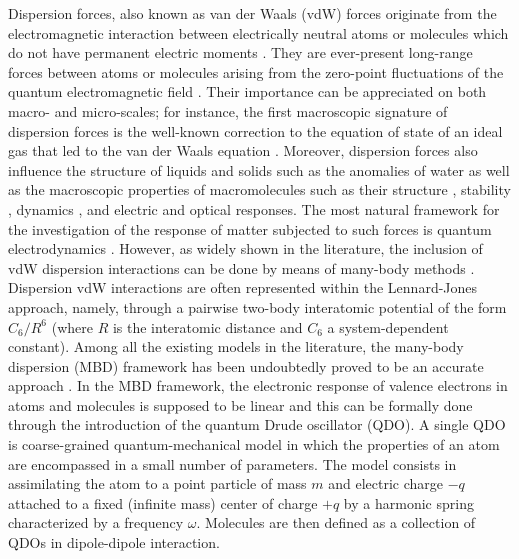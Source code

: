 \documentclass[reprint, amsmath, amssymb, aps]{revtex4-2}
\begin{document}
    Dispersion forces, also known as van der Waals (vdW) forces originate from the electromagnetic interaction between electrically neutral atoms or molecules which do not have permanent electric moments \cite{margenau2013theory,kaplan2006intermolecular,stone2013theory,hirschfelder2009intermolecular}. They are ever-present long-range forces between atoms or molecules arising from the zero-point fluctuations of the quantum electromagnetic field \cite{casimir1948influence,buhmann2013dispersion,buhmann2007dispersion,compagno1995atom,passante2018dispersion}. Their importance can be appreciated on both macro- and micro-scales; for instance, the first macroscopic signature of dispersion forces is the well-known correction to the equation of state of an ideal gas that led to the van der Waals equation \cite{milonni2013quantum}. Moreover, dispersion forces also influence the structure of liquids and solids such as the anomalies of water \cite{schmid2001recent} as well as the macroscopic properties of macromolecules such as their structure \cite{hoja2019reliable}, stability \cite{hoja2018first,mortazavi2018structure}, dynamics \cite{stohr2019quantum,reilly2014role,galante2021anisotropic}, and electric \cite{kleshchonok2018tailoring} and optical \cite{ambrosetti2022optical} responses. The most natural framework for the investigation of the response of matter subjected to such forces is quantum electrodynamics \cite{cohen1997photons,cohen1998atom,bookpreparata,salam2009molecular,craig1998t}. However, as widely shown in the literature, the inclusion of vdW dispersion interactions can be done by means of many-body methods \cite{richardson1975dispersion,mahanty1973dispersion,woods2016materials,tkatchenko2015current,ren2012random,harl2009accurate,dobson2012calculation,parsegian2005van}. Dispersion vdW interactions are often represented within the Lennard-Jones approach, namely, through a pairwise two-body interatomic potential \cite{becke2006simple,becke2006exchange,grimme2010consistent,grimme2006semiempirical,tkatchenko2012accurate,massa2021many} of the form $C_{6}/R^{6}$ (where $R$ is the interatomic distance and $C_6$ a system-dependent constant). Among all the existing models in the literature, the many-body dispersion (MBD) framework has been undoubtedly proved to be an accurate approach \cite{tkatchenko2012accurate,ambrosetti2014long}. In the MBD framework, the electronic response of valence electrons in atoms and molecules is supposed to be linear and this can be formally done through the introduction of the quantum Drude oscillator (QDO). A single QDO is coarse-grained quantum-mechanical model in which the properties of an atom are encompassed in a small number of parameters. The model consists in assimilating the atom to a point particle of mass $m$ and electric charge $-q$ attached to a fixed (infinite mass) center of charge $+q$ by a harmonic spring characterized by a frequency $\omega$. Molecules are then defined as a collection of QDOs in dipole-dipole interaction.
\end{document}
